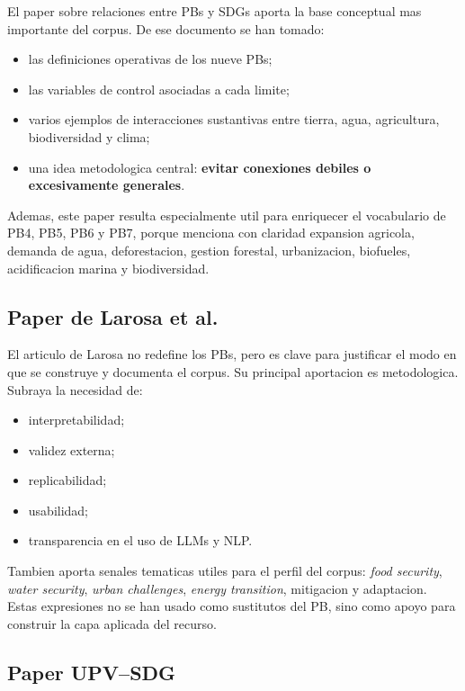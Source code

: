 \documentclass[11pt,a4paper]{article}
\begin{document}
El paper sobre relaciones entre PBs y SDGs aporta la base conceptual mas importante del corpus. De ese documento se han tomado:

\begin{itemize}
\item las definiciones operativas de los nueve PBs;
\item las variables de control asociadas a cada limite;
\item varios ejemplos de interacciones sustantivas entre tierra, agua, agricultura, biodiversidad y clima;
\item una idea metodologica central: \textbf{evitar conexiones debiles o excesivamente generales}.
\end{itemize}

Ademas, este paper resulta especialmente util para enriquecer el vocabulario de PB4, PB5, PB6 y PB7, porque menciona con claridad expansion agricola, demanda de agua, deforestacion, gestion forestal, urbanizacion, biofueles, acidificacion marina y biodiversidad.

\subsection{Paper de Larosa et al.}

El articulo de Larosa no redefine los PBs, pero es clave para justificar el modo en que se construye y documenta el corpus. Su principal aportacion es metodologica. Subraya la necesidad de:

\begin{itemize}
\item interpretabilidad;
\item validez externa;
\item replicabilidad;
\item usabilidad;
\item transparencia en el uso de LLMs y NLP.
\end{itemize}

Tambien aporta senales tematicas utiles para el perfil del corpus: \textit{food security}, \textit{water security}, \textit{urban challenges}, \textit{energy transition}, mitigacion y adaptacion. Estas expresiones no se han usado como sustitutos del PB, sino como apoyo para construir la capa aplicada del recurso.

\subsection{Paper UPV--SDG}
\end{document}
